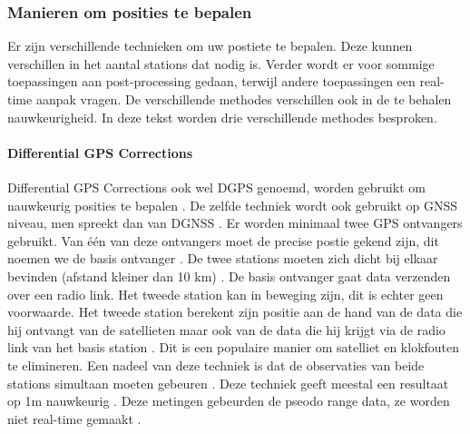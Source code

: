 \subsubsection{Manieren om posities te bepalen}
Er zijn verschillende technieken om uw postiete te bepalen. Deze kunnen verschillen in het aantal stations dat nodig is. Verder wordt er voor sommige toepassingen aan post-processing gedaan, terwijl andere toepassingen een real-time aanpak vragen. De verschillende methodes verschillen ook in de te behalen nauwkeurigheid. In deze tekst worden drie verschillende methodes besproken. 

\paragraph{Differential GPS Corrections}
Differential GPS Corrections ook wel DGPS genoemd, worden gebruikt om nauwkeurig posities  te bepalen \cite{LBibGLONASS2}. De zelfde techniek wordt ook gebruikt op GNSS niveau, men spreekt dan van DGNSS \cite{LBibGNSS8}. Er worden minimaal twee GPS ontvangers gebruikt. Van \'e\'en van deze ontvangers moet de precise postie gekend zijn, dit noemen we de basis ontvanger \cite{LBibGNSS2,LBibRTK}. De twee stations moeten zich dicht bij elkaar bevinden (afstand kleiner dan 10 km) \cite{LBibDGPS}. De basis ontvanger gaat data verzenden over een radio link.  Het tweede station kan in beweging zijn, dit is echter geen voorwaarde. Het tweede station berekent zijn positie aan de hand van de data die hij ontvangt van de satellieten maar ook van de data die hij krijgt via de radio link van het basis station \cite{LBibRTK}. Dit is een populaire manier om satelliet en klokfouten te elimineren. Een nadeel van deze techniek is dat de observaties van beide stations simultaan moeten gebeuren \cite{LBibGNSS2}. Deze techniek geeft meestal een resultaat op 1m nauwkeurig \cite{LBibRTK}. Deze metingen gebeurden de pseodo range data, ze worden niet real-time gemaakt \cite{LBibRTK3}.

